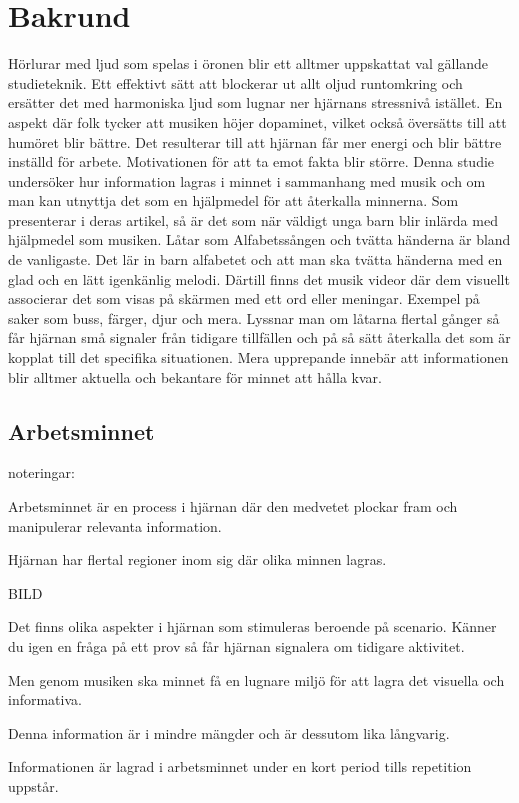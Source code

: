 \documentclass[11p]{article}
\begin{document}
    \section{Bakrund}
    Hörlurar med ljud som spelas i öronen blir ett alltmer uppskattat val gällande studieteknik.
    Ett effektivt sätt att blockerar ut allt oljud runtomkring och ersätter det med harmoniska ljud som lugnar ner hjärnans stressnivå istället.
    En aspekt där folk tycker att musiken höjer dopaminet, vilket också översätts till att humöret blir bättre.
    Det resulterar till att hjärnan får mer energi och blir bättre inställd för arbete.
    Motivationen för att ta emot fakta blir större.
    Denna studie undersöker hur information lagras i minnet i sammanhang med musik och om man kan utnyttja det som en hjälpmedel för att återkalla minnerna.
    Som \textcite{Effectsmusic} presenterar i deras artikel, så är det som när väldigt unga barn blir inlärda med hjälpmedel som musiken.
    Låtar som Alfabetssången och tvätta händerna är bland de vanligaste.
    Det lär in barn alfabetet och att man ska tvätta händerna med en glad och en lätt igenkänlig melodi.
    Därtill finns det musik videor där dem visuellt associerar det som visas på skärmen med ett ord eller meningar.
    Exempel på saker som buss, färger, djur och mera.
    Lyssnar man om låtarna flertal gånger så får hjärnan små signaler från tidigare tillfällen och på så sätt återkalla det som är kopplat till det specifika situationen.
    Mera upprepande innebär att informationen blir alltmer aktuella och bekantare för minnet att hålla kvar.


    \subsection{Arbetsminnet}
    noteringar:
    \begin{itemize} Arbetsminnet är en process i hjärnan där den medvetet plockar fram och manipulerar relevanta information. \end{itemize}

    \begin{itemize} Hjärnan har flertal regioner inom sig där olika minnen lagras. \end{itemize}
    BILD
    \begin{itemize} Det finns olika aspekter i hjärnan som stimuleras beroende på scenario.
     Känner du igen en fråga på ett prov så får hjärnan signalera om tidigare aktivitet. \end{itemize}
    \begin{itemize}  Men genom musiken ska minnet få en lugnare miljö för att lagra det visuella och informativa. \end{itemize}
    \begin{itemize}  Denna information är i mindre mängder och är dessutom lika långvarig. \end{itemize}
    \begin{itemize} Informationen är lagrad i arbetsminnet under en kort period tills repetition uppstår. \end{itemize}
\end{document}
